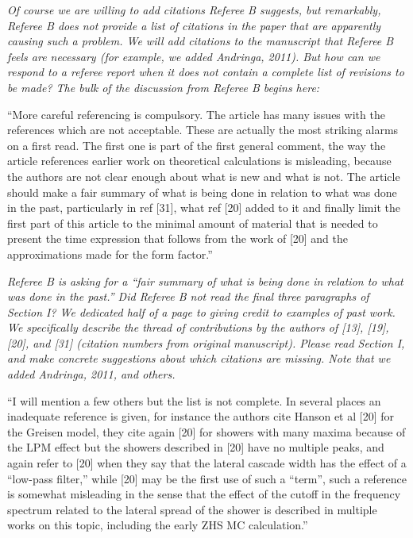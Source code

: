 \documentclass[12pt]{article}
\begin{document}
\textit{Of course we are willing to add citations Referee B suggests, but remarkably, Referee B does not provide a list of citations in the paper that are apparently causing such a problem.  We will add citations to the manuscript that Referee B feels are necessary (for example, we added Andringa, 2011).  But how can we respond to a referee report when it does not contain a complete list of revisions to be made?  The bulk of the discussion from Referee B begins here:}

``More careful referencing is compulsory. The article has many issues with the references which are not acceptable. These are actually the most striking alarms on a first read. The first one is part of the first general comment, the way the article references earlier work on theoretical calculations is misleading, because the authors are not clear enough about what is new and what is not. The article should make a fair summary of what is being done in relation to what was done in the past, particularly in ref [31], what ref [20] added to it and finally limit the first part of this article to the minimal amount of material that is needed to present the time expression that follows from the work of [20] and the approximations made for the form factor.''

\textit{Referee B is asking for a ``fair summary of what is being done in relation to what was done in the past.''  Did Referee B not read the final three paragraphs of Section I?  We dedicated half of a page to giving credit to examples of past work.  We specifically describe the thread of contributions by the authors of [13], [19], [20], and [31] (citation numbers from original manuscript).  Please read Section I, and make concrete suggestions about which citations are missing.  Note that we added Andringa, 2011, and others.}

``I will mention a few others but the list is not complete.  In several places an inadequate reference is given, for instance the authors cite Hanson et al [20] for the Greisen model, they cite again [20] for showers with many maxima because of the LPM effect but the showers described in [20] have no multiple peaks, and again refer to [20] when they say that the lateral cascade width has the effect of a ``low-pass filter,'' while [20] may be the first use of such a ``term'', such a reference is somewhat misleading in the sense that the effect of the cutoff in the frequency spectrum related to the lateral spread of the shower is described in multiple works on this topic, including the early ZHS MC calculation.''
\end{document}
